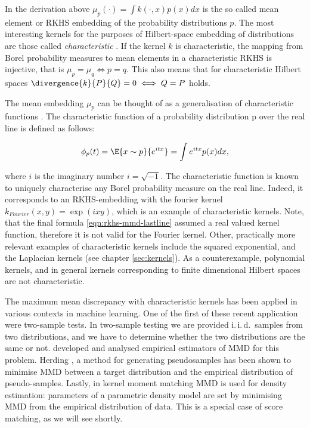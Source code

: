 In the derivation above $\mu_p(\cdot) = \int k(\cdot,x) p(x) dx$ is the so called mean element or RKHS embedding of the probability distributions $p$. The most interesting kernels for the purposes of Hilbert-space embedding of distributions are those called \emph{characteristic} \cite{}. If the kernel $k$ is characteristic, the mapping from Borel probability measures to mean elements in a characteristic RKHS is injective, that is $\mu_p = \mu_q \iff p = q$. This also means that for characteristic Hilbert spaces $\divergence{k}{P}{Q} = 0 \iff Q=P$ holds.

The mean embedding $\mu_p$ can be thought of as a generalisation of characteristic functions \cite{}. The characteristic function of a probability distribution p over the real line is defined as follows:

\begin{equation}
\phi_p(t) = \E{x\sim p}{e^{ i t x}} = \int e^{i t x} p(x) dx,
\end{equation}

where $i$ is the imaginary number $i=\sqrt{-1}$. The characteristic function is known to uniquely characterise any Borel probability measure on the real line. Indeed, it corresponds to an RKHS-embedding with the fourier kernel $k_{Fourier}(x,y) = \exp(ixy)$, which is an example of characteristic kernels. Note, that the final formula \ref{eqn:rkhs-mmd-lastline} assumed a real valued kernel function, therefore it is not valid for the Fourier kernel. Other, practically more relevant examples of characteristic kernels include the squared exponential, and the Laplacian kernels (see chapter \ref{sec:kernels}). As a counterexample, polynomial kernels, and in general kernels corresponding to finite dimensional Hilbert spaces are not characteristic.

The maximum mean discrepancy with characteristic kernels has been applied in various contexts in machine learning. One of the first of these recent application were two-sample tests. In two-sample testing we are provided i.\,i.\,d.\ samples from two distributions, and we have to determine whether the two distributions are the same or not. \cite{} developed and analysed empirical estimators of MMD for this problem. Herding \cite{}, a method for generating pseudosamples has been shown to minimise MMD between a target distribution and the empirical distribution of pseudo-samples. Lastly, in kernel moment matching \cite{SmolaShaweTaylor} MMD is used for density estimation: parameters of a parametric density model are set by minimising MMD from the empirical distribution of data. This is a special case of score matching, as we will see shortly.


